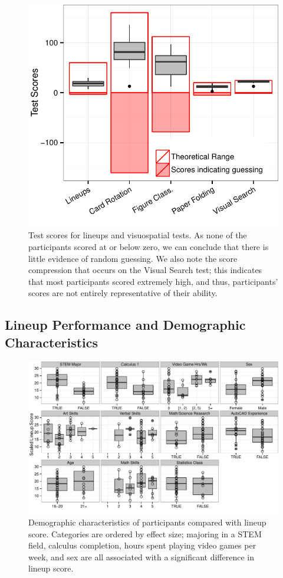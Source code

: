 \documentclass[11pt]{isuthesis}\usepackage[]{graphicx}\usepackage[]{color}
\begin{document}
\begin{figure}[ht]\centering
\includegraphics[width=.6\linewidth]{fig-ResultsScaledScores-1}
\caption[Test scores for lineups and visuospatial tests]{Test scores for lineups and visuospatial tests. As none of the participants scored at or below zero, we can conclude that there is little evidence of random guessing. We also note the score compression that occurs on the Visual Search test; this indicates that most participants scored extremely high, and thus, participants' scores are not entirely representative of their ability. \label{fig:Scores}}
\end{figure}
% 



\subsection{Lineup Performance and Demographic Characteristics}


\begin{figure}[h!tb]\centering
\includegraphics[width=.85\linewidth]{fig-VisReasoningCategorical-1}
\caption[Demographic characteristics of participants and lineup scores]{Demographic characteristics of participants compared with lineup score. Categories are ordered by effect size; majoring in a STEM field, calculus completion, hours spent playing video games per week, and sex are all associated with a significant difference in lineup score. }\label{fig:visualaptitudecat}
\end{figure}
\end{document}

